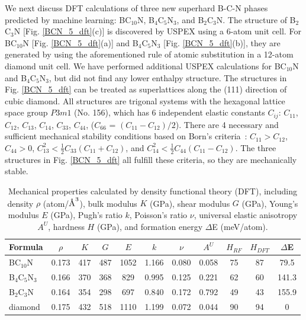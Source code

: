 		We next discuss DFT calculations of three new superhard B-C-N phases predicted by machine learning: BC$_{10}$N, B$_4$C$_5$N$_3$, and B$_2$C$_3$N.
	The structure of B$_2$C$_3$N [Fig. \ref{BCN_5_dft}(c)] is discovered by USPEX using a 6-atom unit cell. For BC$_{10}$N [Fig. \ref{BCN_5_dft}(a)] and B$_4$C$_5$N$_3$ [Fig. \ref{BCN_5_dft}(b)], they are generated by using the aforementioned rule of atomic substitution in a 12-atom diamond unit cell. We have performed additional USPEX calculations for BC$_{10}$N and B$_4$C$_5$N$_3$, but did not find any lower enthalpy structure.
	The structures in Fig. \ref{BCN_5_dft} can be treated as superlattices along the (111) direction of cubic diamond. All structures are trigonal systems with the hexagonal lattice space group $P3m1$ (No. 156), which has 6 independent elastic constants $C_{ij}$: $C_{11}$, $C_{12}$, $C_{13}$, $C_{14}$, $C_{33}$, $C_{44}$, ($C_{66}$ = $(C_{11}-C_{12})/2$). There are 4 necessary and sufficient mechanical stability conditions based on Born's criteria~\cite{PhysRevB.90.224104}: $C_{11} > C_{12}$, $C_{44} > 0$, $C_{13}^2  < \frac{1}{2}C_{33}(C_{11}+C_{12})$, and $C_{14}^2 < \frac{1}{2}C_{44}(C_{11}-C_{12})$.
	The three structures in Fig. \ref{BCN_5_dft} all fulfill these criteria, so they are mechanically stable.
	
    \begingroup
	\setlength{\tabcolsep}{6pt} %
	\renewcommand{\arraystretch}{1.5} %
	\begin{table}[t]
		\caption[Mechanical  properties of newly-found superhard B-C-N compounds.]{Mechanical properties calculated by density functional theory (DFT), including density $\rho$ (atom/$\text{\normalfont\AA}^3$), bulk modulus $K$ (GPa), shear modulus $G$ (GPa), Young's modulus $E$ (GPa), Pugh's ratio $k$, Poisson's ratio $\nu$, universal elastic anisotropy $A^U$, hardness $H$ (GPa), and formation energy $\Delta$E (meV/atom).}
		\label{tab:table2}
		\begin{tabular}{l|c|c|c|c|c|c|c|c|c|c} %
			Formula   & $\rho$ & $K$ & $G$ & $E$ & $k$ & $\nu$ & $A^U$ & $H_{RF}$ & $H_{DFT}$ & $\Delta$E\\
			\hline
			BC$_{10}$N   & 0.173 & 417  & 487 & 1052 & 1.166 & 0.080 & 0.058 & 75 & 87 & 79.5 \\
			B$_4$C$_5$N$_3$  & 0.166 & 370  & 368 & 829 & 0.995 & 0.125 & 0.221 & 62 & 60 & 141.3 \\
			B$_2$C$_3$N  & 0.164 & 354  & 298 & 697 & 0.840 & 0.172 & 0.792 & 49 & 43 & 155.9 \\
			diamond  & 0.175 & 432 & 518 & 1110 & 1.199 & 0.072 & 0.044 &90 & 94 & 0
		\end{tabular}
	\end{table}
	\endgroup
	
